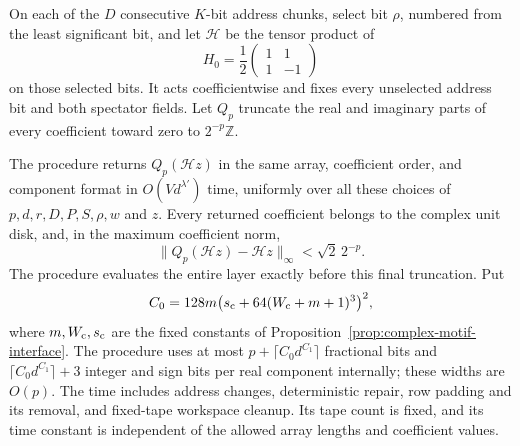 \begin{proposition}
On each of the $D$ consecutive $K$-bit address chunks, select bit
$\rho$, numbered from the least significant bit, and let
$\mathcal H$ be the tensor product of
\[
 H_0=\frac12\begin{pmatrix}1&1\\1&-1\end{pmatrix}
\]
on those selected bits. It acts coefficientwise and fixes every
unselected address bit and both spectator fields. Let $Q_p$ truncate
the real and imaginary parts of every coefficient toward zero to
$2^{-p}\mathbb Z$.

The procedure returns $Q_p(\mathcal H z)$ in the same array,
coefficient order, and component format in $O(Vd^{\lambda'})$ time,
uniformly over all these
choices of $p,d,r,D,P,S,\rho,w$ and $z$. Every returned coefficient belongs
to the complex unit disk, and, in the maximum coefficient norm,
\[
 \|Q_p(\mathcal H z)-\mathcal H z\|_\infty
       <\sqrt2\,2^{-p}.
\]
The procedure evaluates the entire layer exactly before this final
truncation. Put
\[
 C_0=128m\bigl(s_{\rm c}+64(W_{\rm c}+m+1)^3\bigr)^2,
\]
where $m,W_{\rm c},s_{\rm c}$ are the fixed constants of
Proposition~\ref{prop:complex-motif-interface}. The procedure uses
at most $p+\lceil C_0d^{C_1}\rceil$ fractional bits and
$\lceil C_0d^{C_1}\rceil+3$ integer and sign bits per real component
internally; these widths are $O(p)$. The time includes address changes,
deterministic repair, row padding and its removal, and fixed-tape
workspace cleanup. Its tape count is fixed, and its time constant is
independent of the allowed array lengths and coefficient values.
\end{proposition}


